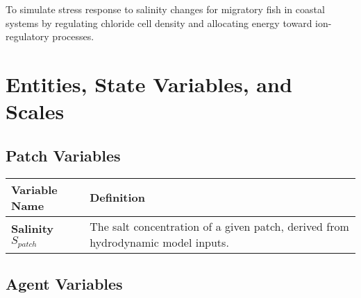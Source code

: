 \documentclass[
]{book}
\begin{document}
To simulate stress response to salinity changes for migratory fish in coastal systems by regulating chloride cell density and allocating energy toward ion-regulatory processes.

\section{Entities, State Variables, and Scales}\label{entities-state-variables-and-scales}

\subsection{Patch Variables}\label{patch-variables}

\begin{longtable}[]{@{}
  >{\raggedright\arraybackslash}p{}
  >{\raggedright\arraybackslash}p{}@{}}
\toprule\noalign{}
\begin{minipage}[b]{\linewidth}\raggedright
Variable Name
\end{minipage} & \begin{minipage}[b]{\linewidth}\raggedright
Definition
\end{minipage} \\
\midrule\noalign{}
\endhead
\bottomrule\noalign{}
\endlastfoot
\textbf{Salinity} \(S_{patch}\) & The salt concentration of a given patch, derived from hydrodynamic model inputs. \\
\end{longtable}

\subsection{Agent Variables}\label{agent-variables}
\end{document}

